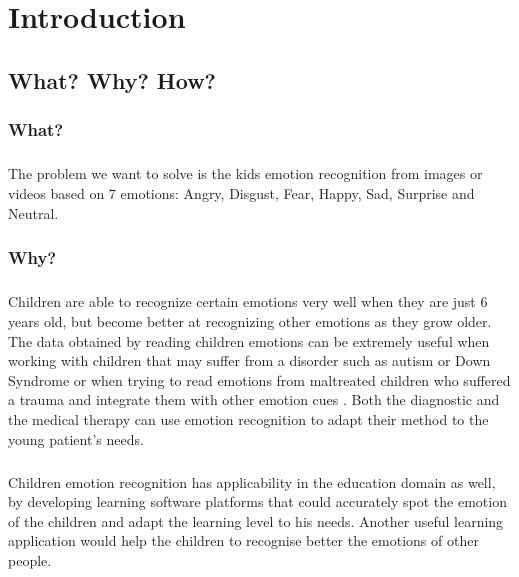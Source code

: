 \documentclass[runningheads,a4paper,11pt]{report}
\begin{document}
\tableofcontents

\newpage

\listoffigures

\newpage


\newpage


\chapter{Introduction}
\label{chapter:introduction}

\section{What? Why? How?}
\label{section:whatwhyhow}

\subsection{What?}
\label{subsection:what}
\paragraph{}
The problem we want to solve is the kids emotion recognition from images or videos based on 7 emotions: Angry, Disgust, Fear, Happy, Sad, Surprise and Neutral.

\subsection{Why?}
\label{subsection:why}
\paragraph{}
Children are able to recognize certain emotions very well when they are just 6 years old, but become better at recognizing other emotions as they grow older. The data obtained by reading children emotions can be extremely useful when working with children that may suffer from a disorder such as autism \cite{Bal2010} or Down Syndrome  \cite{Kasari2001} or when trying to read emotions from maltreated children who suffered a trauma and integrate them with other emotion cues \cite{Camras1996}. Both the diagnostic and the medical therapy can use emotion recognition to adapt their method to the young patient's needs.

\paragraph{}
Children emotion recognition has applicability in the education domain as well, by developing learning software platforms that could accurately spot the emotion of the children and adapt the learning level to his needs. Another useful learning application would help the children to recognise better the emotions of other people.
\end{document}
